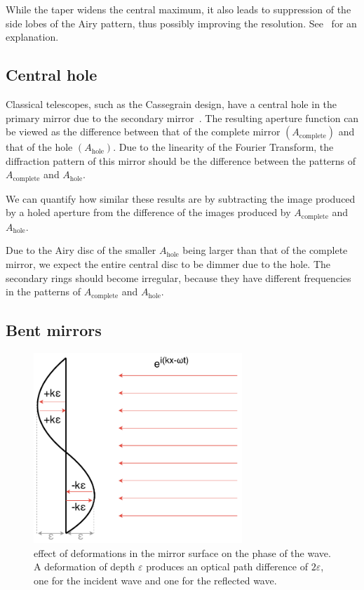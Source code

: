 \documentclass[11pt]{article}
\newcommand{\R}[1]{\mathrm{#1}}
\newcommand{\eps}{\varepsilon}
\begin{document}
While the taper widens the central maximum, it also leads to suppression of the side lobes of the Airy pattern, thus possibly improving the resolution. See~\cite[Section~11.3]{hecht} for an explanation.

\subsection{Central hole}\label{sec:analysis:hole}
Classical telescopes, such as the Cassegrain design, have a central hole in the primary mirror due to the secondary mirror~\cite[Section~7.2.3]{RadioAstro}. The resulting aperture function can be viewed as the difference between that of the complete mirror $(A_{\R{complete}})$ and that of the hole $(A_{\R{hole}})$. Due to the linearity of the Fourier Transform, the diffraction pattern of this mirror should be the difference between the patterns of $A_{\R{complete}}$ and $A_{\R{hole}}$.

We can quantify how similar these results are by subtracting the image produced by a holed aperture from the difference of the images produced by $A_{\R{complete}}$ and $A_{\R{hole}}$.

Due to the Airy disc of the smaller $A_{\R{hole}}$ being larger than that of the complete mirror, we expect the entire central disc to be dimmer due to the hole. The secondary rings should become irregular, because they have different frequencies in the patterns of $A_{\R{complete}}$ and $A_{\R{hole}}$.

\subsection{Bent mirrors}\label{sec:analysis:bent}
\begin{figure}
    \centering
    \begin{minipage}{0.5\textwidth}
        \centering
        \includegraphics[width=0.7\textwidth]{pictures/mirror_dent.pdf}
    \end{minipage}%
    \hfill
    \begin{minipage}{0.4\textwidth}
        \caption{effect of deformations in the mirror surface on the phase of the wave. A deformation of depth $\eps$ produces an optical path difference of $2\eps$, one for the incident wave and one for the reflected wave.}\label{fig:bend}
    \end{minipage}
\end{figure}
\end{document}
